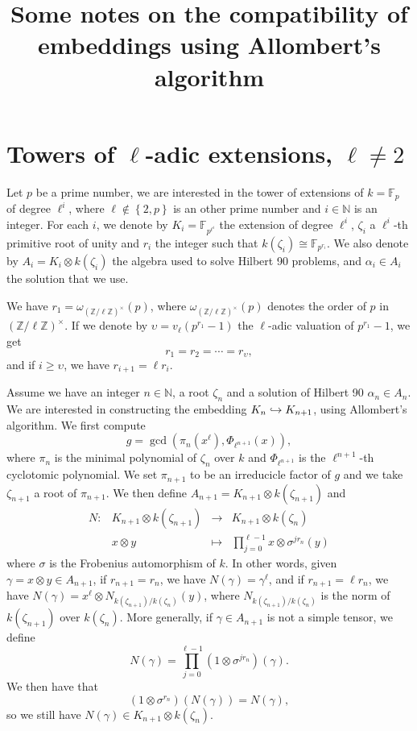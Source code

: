 \documentclass[a4paper,11pt]{article}
\title{Some notes on the compatibility of embeddings using Allombert's algorithm}
\author{}
\begin{document}
\maketitle





\section{Towers of $\ell$-adic extensions, $\ell\neq2$}
\label{sec:ladic}

Let $p$ be a prime number, we are interested in the tower of extensions of
$k=\mathbb{F}_p$ of degree $\ell^i$, where $\ell\notin\left\{ 2, p
\right\}$ is an other prime
number and $i\in\mathbb{N}$ is an integer. For each $i$, we denote by
$K_i=\mathbb{F}_{p^{\ell^i}}$ the extension of degree $\ell^i$, $\zeta_i$ a
$\ell^i$-th primitive root of unity and $r_i$ the integer such that
$k(\zeta_i)\cong\mathbb{F}_{p^{r_i}}$. We also denote by $A_i=K_i\otimes
k(\zeta_i)$ the algebra used to solve Hilbert 90 problems, and $\alpha_i\in A_i$ the
solution that we use.

We have $r_1=\omega_{(\mathbb{Z}/\ell\mathbb{Z})^\times}(p)$, where
$\omega_{(\mathbb{Z}/\ell\mathbb{Z})^\times}(p)$ denotes the order of $p$ in
$(\mathbb{Z}/\ell\mathbb{Z})^\times$. If we denote by $\upsilon=v_\ell(p^{r_1}-1)$
the $\ell$-adic valuation of $p^{r_1}-1$, we get 
\[
  r_1 = r_2 = \cdots = r_{\upsilon},
\]
and if $i\geq\upsilon$, we have $r_{i+1}=\ell r_i$.

Assume we have an integer $n\in\mathbb{N}$, a root
$\zeta_n$ and a solution of Hilbert 90 $\alpha_n\in A_n$. We are interested in
constructing the embedding $K_n\hookrightarrow K_{n+1}$, using Allombert's algorithm. We
first compute 
\[
  g = \gcd(\pi_n(x^\ell), \Phi_{\ell^{n+1}}(x)),
\]
where $\pi_n$ is the minimal polynomial of $\zeta_n$ over $k$ and
$\Phi_{\ell^{n+1}}$ is the $\ell^{n+1}$-th cyclotomic polynomial. We set
$\pi_{n+1}$ to be an irreducicle factor of $g$ and we take $\zeta_{n+1}$ a root
of $\pi_{n+1}$. We then define $A_{n+1}=K_{n+1}\otimes k(\zeta_{n+1})$ and
\[
\begin{array}{cccc}
  N: & K_{n+1}\otimes k(\zeta_{n+1}) & \to & K_{n+1}\otimes k(\zeta_n) \\
  & x\otimes y & \mapsto & \prod_{j=0}^{\ell-1} x \otimes \sigma^{jr_n}(y)
\end{array}
\]
where $\sigma$ is the Frobenius automorphism of $k$. In other words, given
$\gamma=x\otimes y\in A_{n+1}$, if $r_{n+1}=r_n$, we have $N(\gamma) =
\gamma^\ell$, and if $r_{n+1}=\ell r_n$, we have $N(\gamma) = x^\ell\otimes
N_{k(\zeta_{n+1})/k(\zeta_n)}(y)$, where $N_{k(\zeta_{n+1})/k(\zeta_n)}$ is the
norm of $k(\zeta_{n+1})$ over $k(\zeta_n)$. More generally, if $\gamma\in
A_{n+1}$ is not a simple tensor, we define
\[
  N(\gamma) = \prod_{j=0}^{\ell-1}(1\otimes\sigma^{jr_n})(\gamma).
\]
We then have that
\[
  (1\otimes\sigma^{r_n})(N(\gamma)) = N(\gamma),
\]
so we still have $N(\gamma)\in K_{n+1}\otimes k(\zeta_n)$.
\end{document}
